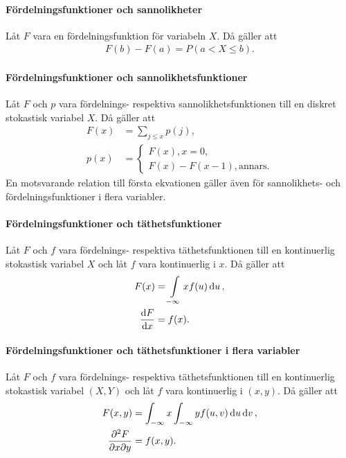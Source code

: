 \proof

\paragraph{Fördelningsfunktioner och sannolikheter}
Låt $F$ vara en fördelningsfunktion för variabeln $X$. Då gäller att
\begin{align*}
	F(b) - F(a) = P(a < X\leq b).
\end{align*}

\proof

\paragraph{Fördelningsfunktioner och sannolikhetsfunktioner}
Låt $F$ och $p$ vara fördelnings- respektiva sannolikhetsfunktionen till en diskret stokastisk variabel $X$. Då gäller att
\begin{align*}
	F(x) &= \sum\limits_{j\leq x}p(j), \\
	p(x) &=
	\begin{cases}
		F(x), x = 0, \\
		F(x) - F(x - 1), \text{annars}.
	\end{cases}
\end{align*}
En motsvarande relation till första ekvationen gäller även för sannolikhets- och fördelningsfunktioner i flera variabler.

\proof

\paragraph{Fördelningsfunktioner och täthetsfunktioner}
Låt $F$ och $f$ vara fördelnings- respektiva täthetsfunktionen till en kontinuerlig stokastisk variabel $X$ och låt $f$ vara kontinuerlig i $x$. Då gäller att
\begin{align*}
	F(x)          &= \int\limits_{-\infty}{x}f(u)\dd{u}, \\
	\dv{F}{x} (x) &= f(x).
\end{align*}

\paragraph{Fördelningsfunktioner och täthetsfunktioner i flera variabler}
Låt $F$ och $f$ vara fördelnings- respektiva täthetsfunktionen till en kontinuerlig stokastisk variabel $(X, Y)$ och låt $f$ vara kontinuerlig i $(x, y)$. Då gäller att
\begin{align*}
	F(x, y)          &= \int_{-\infty}{x}\int_{-\infty}{y}f(u, v)\dd{u}\dd{v}, \\
	\pdv{F}{x}{y} (x, y) &= f(x, y).
\end{align*}

